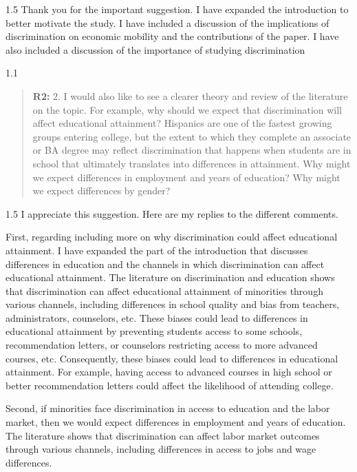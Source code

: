 \documentclass[12pt,english]{article}
\newcommand{\rrquote}{1.1}
\newcommand{\rrxspc}{1.5}
\begin{document}
\begin{refsection}
        \begin{spacing}{\rrxspc}
            Thank you for the important suggestion. I have expanded the introduction to better motivate the study. I have included a discussion of the implications of discrimination on economic mobility and the contributions of the paper. I have also included a discussion of the importance of studying discrimination    
    \end{spacing}

    \begin{spacing}{\rrquote}
        \begin{quotation}
        \textbf{R2: } 2. I would also like to see a clearer theory and review of the literature on the topic. For example, why should we expect that discrimination will affect educational attainment? Hispanics are one of the fastest growing groups entering college, but the extent to which they complete an associate or BA degree may reflect discrimination that happens when students are in school that ultimately translates into differences in attainment. Why might we expect differences in employment and years of education?
        Why might we expect differences by gender?
        \end{quotation}
        \end{spacing}
        
        \begin{spacing}{\rrxspc}
            I appreciate this suggestion. Here are my replies to the different comments.
            
            First, regarding including more on why discrimination could affect educational attainment. I have expanded the part of the introduction that discusses differences in education and the channels in which discrimination can affect educational attainment. The literature on discrimination and education shows that discrimination can affect educational attainment of minorities through various channels, including differences in school quality and bias from teachers, administrators, counselors, etc. These biases could lead to differences in educational attainment by preventing students access to some schools, recommendation letters, or counselors restricting access to more advanced courses, etc. Consequently, these biases could lead to differences in educational attainment. For example, having access to advanced courses in high school or better recommendation letters could affect the likelihood of attending college.

            Second, if minorities face discrimination in access to education and the labor market, then we would expect differences in employment and years of education. The literature shows that discrimination can affect labor market outcomes through various channels, including differences in access to jobs and wage differences.
            

\end{spacing}
\end{refsection}
\end{document}
